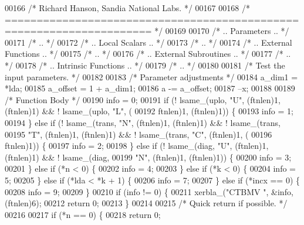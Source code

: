 \begin{DoxyCode}
00166 \textcolor{comment}{/*     Richard Hanson, Sandia National Labs. */}
00167 
00168 \textcolor{comment}{/*  ===================================================================== */}
00169 
00170 \textcolor{comment}{/*     .. Parameters .. */}
00171 \textcolor{comment}{/*     .. */}
00172 \textcolor{comment}{/*     .. Local Scalars .. */}
00173 \textcolor{comment}{/*     .. */}
00174 \textcolor{comment}{/*     .. External Functions .. */}
00175 \textcolor{comment}{/*     .. */}
00176 \textcolor{comment}{/*     .. External Subroutines .. */}
00177 \textcolor{comment}{/*     .. */}
00178 \textcolor{comment}{/*     .. Intrinsic Functions .. */}
00179 \textcolor{comment}{/*     .. */}
00180 
00181 \textcolor{comment}{/*     Test the input parameters. */}
00182 
00183     \textcolor{comment}{/* Parameter adjustments */}
00184     a\_dim1 = *lda;
00185     a\_offset = 1 + a\_dim1;
00186     a -= a\_offset;
00187     --x;
00188 
00189     \textcolor{comment}{/* Function Body */}
00190     info = 0;
00191     \textcolor{keywordflow}{if} (! lsame\_(uplo, \textcolor{stringliteral}{"U"}, (ftnlen)1, (ftnlen)1) && ! lsame\_(uplo, \textcolor{stringliteral}{"L"}, (
00192         ftnlen)1, (ftnlen)1)) \{
00193     info = 1;
00194     \} \textcolor{keywordflow}{else} \textcolor{keywordflow}{if} (! lsame\_(trans, \textcolor{stringliteral}{"N"}, (ftnlen)1, (ftnlen)1) && ! lsame\_(trans, 
00195         \textcolor{stringliteral}{"T"}, (ftnlen)1, (ftnlen)1) && ! lsame\_(trans, \textcolor{stringliteral}{"C"}, (ftnlen)1, (
00196         ftnlen)1)) \{
00197     info = 2;
00198     \} \textcolor{keywordflow}{else} \textcolor{keywordflow}{if} (! lsame\_(diag, \textcolor{stringliteral}{"U"}, (ftnlen)1, (ftnlen)1) && ! lsame\_(diag, 
00199         \textcolor{stringliteral}{"N"}, (ftnlen)1, (ftnlen)1)) \{
00200     info = 3;
00201     \} \textcolor{keywordflow}{else} \textcolor{keywordflow}{if} (*n < 0) \{
00202     info = 4;
00203     \} \textcolor{keywordflow}{else} \textcolor{keywordflow}{if} (*k < 0) \{
00204     info = 5;
00205     \} \textcolor{keywordflow}{else} \textcolor{keywordflow}{if} (*lda < *k + 1) \{
00206     info = 7;
00207     \} \textcolor{keywordflow}{else} \textcolor{keywordflow}{if} (*incx == 0) \{
00208     info = 9;
00209     \}
00210     \textcolor{keywordflow}{if} (info != 0) \{
00211     xerbla\_(\textcolor{stringliteral}{"CTBMV "}, &info, (ftnlen)6);
00212     \textcolor{keywordflow}{return} 0;
00213     \}
00214 
00215 \textcolor{comment}{/*     Quick return if possible. */}
00216 
00217     \textcolor{keywordflow}{if} (*n == 0) \{
00218     \textcolor{keywordflow}{return} 0;

\end{DoxyCode}
